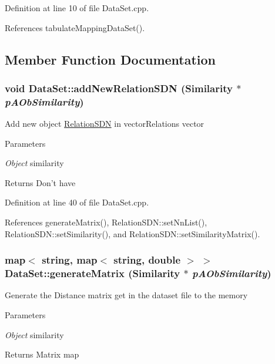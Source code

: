 Definition at line 10 of file DataSet.cpp.

References tabulateMappingDataSet().

\subsection{Member Function Documentation}
\hypertarget{classDataSet_a88e3f1f9e32bd459356869c3f13401fc}{
\subsubsection[{addNewRelationSDN}]{\setlength{\rightskip}{0pt plus 5cm}void DataSet::addNewRelationSDN ({\bf Similarity} $\ast$ {\em pAObSimilarity})}}
\label{classDataSet_a88e3f1f9e32bd459356869c3f13401fc}
Add new object \hyperlink{classRelationSDN}{RelationSDN} in vectorRelations vector 
\begin{DoxyParams}{Parameters}
\item[{\em Object}]similarity \end{DoxyParams}
\begin{DoxyReturn}{Returns}
Don't have 
\end{DoxyReturn}


Definition at line 40 of file DataSet.cpp.

References generateMatrix(), RelationSDN::setNnList(), RelationSDN::setSimilarity(), and RelationSDN::setSimilarityMatrix().\hypertarget{classDataSet_a17c8ba146ec31cd291ded2be3f8833d5}{
\subsubsection[{generateMatrix}]{\setlength{\rightskip}{0pt plus 5cm}map$<$ string, map$<$ string, double $>$ $>$ DataSet::generateMatrix ({\bf Similarity} $\ast$ {\em pAObSimilarity})}}
\label{classDataSet_a17c8ba146ec31cd291ded2be3f8833d5}
Generate the Distance matrix get in the dataset file to the memory 
\begin{DoxyParams}{Parameters}
\item[{\em Object}]similarity \end{DoxyParams}
\begin{DoxyReturn}{Returns}
Matrix map 
\end{DoxyReturn}


